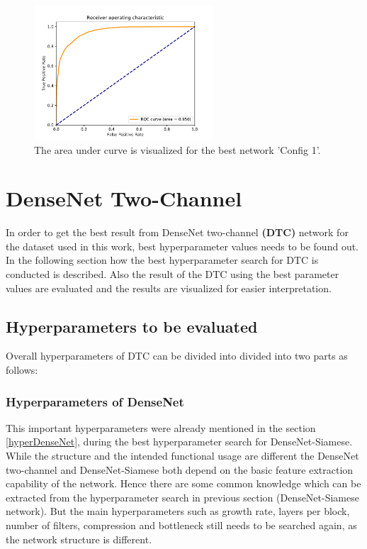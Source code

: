 \begin{figure}[ht]
\centering
\includegraphics[height= 5cm]{images/densenet/siamese/keras_densenet_siamese_4Nov_15400_9497}
\caption[Area under curve for best Config 1]{The area under curve is visualized for the best network 'Config 1'.}
\label{fig:auc_top_config}
\end{figure}


\flushbottom
\newpage

\section{DenseNet Two-Channel}
In order to get the best result from DenseNet two-channel \textbf{(DTC)} network for the dataset used in this work, best hyperparameter values needs to be found out. 
In the following section how the best hyperparameter search for DTC is conducted is described. Also the result of the DTC using the best parameter values are evaluated and the results are visualized for easier interpretation.

\subsection{Hyperparameters to be evaluated}
Overall hyperparameters of DTC can be divided into divided into two parts as follows:
\subsubsection{Hyperparameters of DenseNet}
This important hyperparameters were already mentioned in the section \ref{hyperDenseNet}, during the best hyperparameter search for DenseNet-Siamese. While the structure and the intended functional usage are different the DenseNet two-channel
and DenseNet-Siamese both depend on the basic feature extraction capability of the network. Hence there are some common knowledge which can be extracted from the hyperparameter search in previous section (DenseNet-Siamese network). But the main 
hyperparameters such as growth rate, layers per block, number of filters, compression and bottleneck still needs to be searched again, as the network structure is different.

